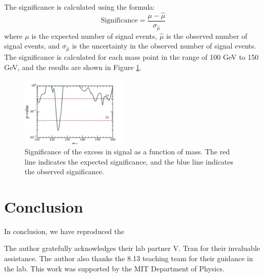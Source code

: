 The significance is calculated using the formula:
\begin{equation}
  \text{Significance} = \frac{\mu - \hat{\mu}}{\sigma_{\hat{\mu}}}
\end{equation}
where $\mu$ is the expected number of signal events, $\hat{\mu}$ is the observed number of signal events, and $\sigma_{\hat{\mu}}$ is the uncertainty in the observed number of signal events. The significance is calculated for each mass point in the range of 100 GeV to 150 GeV, and the results are shown in Figure \ref{fig:significance}.
\begin{figure}[h]
  \centering
  \includegraphics[width=0.45\textwidth]{Figures/p-value.png}
  \caption{Significance of the excess in signal as a function of mass. The red line indicates the expected significance, and the blue line indicates the observed significance.}
  \label{fig:significance}
\end{figure}

\section{Conclusion}
In conclusion, we have reproduced the 

\begin{acknowledgments} The author gratefully acknowledges their lab partner V. Tran for their invaluable assistance. The author also thanks the 8.13 teaching team for their guidance in the lab. This work was supported by the MIT Department of Physics. 
\end{acknowledgments}





